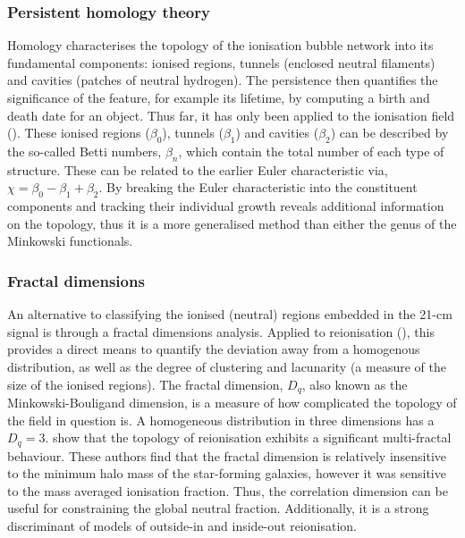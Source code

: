 \subsubsection{Persistent homology theory}

Homology characterises the topology of the ionisation bubble network into its fundamental components: ionised regions, tunnels (enclosed neutral filaments) and cavities (patches of neutral hydrogen). The persistence then quantifies the significance of the feature, for example its lifetime, by computing a birth and death date for an object.  Thus far, it has only been applied to the ionisation field (\cite{Elbers:2019}). These ionised regions ($\beta_{0}$), tunnels ($\beta_{1}$) and cavities ($\beta_{2}$) can be described by the so-called Betti numbers, $\beta_{n}$, which contain the total number of each type of structure. These can be related to the earlier Euler characteristic via, $\chi = \beta_{0} - \beta_{1} + \beta_{2}$. By breaking the Euler characteristic into the constituent components and tracking their individual growth reveals additional information on the topology, thus it is a more generalised method than either the genus of the Minkowski functionals.

\subsubsection{Fractal dimensions}

An alternative to classifying the ionised (neutral) regions embedded in the 21-cm signal is through a fractal dimensions analysis. Applied to reionisation (\cite{Bandyopadhyay:2017}), this provides a direct means to quantify the deviation away from a homogenous distribution, as well as the degree of clustering and lacunarity (a measure of the size of the ionised regions). The fractal dimension, $D_{q}$, also known as the Minkowski-Bouligand dimension, is a measure of how complicated the topology of the field in question is. A homogeneous distribution in three dimensions has a $D_{q}=3$. \cite{Bandyopadhyay:2017} show that the topology of reionisation exhibits a significant multi-fractal behaviour. These authors find that the fractal dimension is relatively insensitive to the minimum halo mass of the star-forming galaxies, however it was sensitive to the mass averaged ionisation fraction. Thus, the correlation dimension can be useful for constraining the global neutral fraction. Additionally, it is a strong discriminant of models of outside-in and inside-out reionisation.

